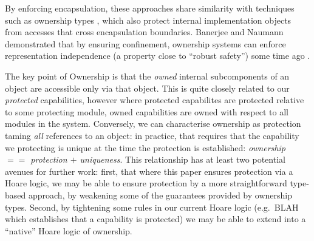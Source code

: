 By enforcing encapsulation,  %
these approaches share similarity with techniques such as
ownership types \cite{ownalias,NobPotVitECOOP98}, which also
protect internal implementation objects from accesses that cross
encapsulation boundaries.  Banerjee and Naumann demonstrated that by
ensuring confinement, ownership
systems can enforce representation independence (a property close to
``robust safety'') some time ago \cite{Banerjee:2005}.


The key point of Ownership is that the \textit{owned} internal
subcomponents of an object are accessible only via that object.
This
is quite closely related to our \textit{protected} capabilities,
however where protected capabilites are protected relative to some
protecting module, owned capabilities are owned with respect to all
modules in the system.  Conversely, we can characterise ownership as
protection taming \textit{all} references to an object: in practice,
that requires that the capability we protecting is unique at the time
the protection is established: \textit{ownership $==$ protection $+$
  uniqueness}.  This relationship has at least two potential avenues
for further work: first, that where this paper ensures protection via
a Hoare logic, we may be able to ensure protection by a
more straightforward type-based approach, by weakening some of the
guarantees provided by ownership types.  Second,  by tightening some
rules in our current Hoare logic (e.g.\ BLAH which establishes that a
capability is protected) we may be able to extend into a ``native''
Hoare logic of ownership.







